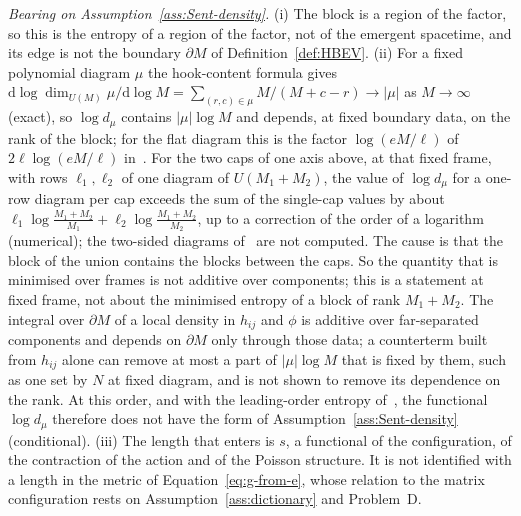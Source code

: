 \emph{Bearing on Assumption~\ref{ass:Sent-density}.} (i) The block is a region of the factor, so this is the entropy of a region of the factor, not of the emergent spacetime, and its edge is not the boundary \(\partial M\) of Definition~\ref{def:HBEV}. (ii) For a fixed polynomial diagram \(\mu\) the hook-content formula gives \(\mathrm d\log\dim_{U(M)}\mu/\mathrm d\log M=\sum_{(r,c)\in\mu}M/(M+c-r)\to|\mu|\) as \(M\to\infty\) (exact), so \(\log d_\mu\) contains \(|\mu|\log M\) and depends, at fixed boundary data, on the rank of the block; for the flat diagram this is the factor \(\log(eM/\ell)\) of \(2\ell\log(eM/\ell)\) in~\cite{FlissFrenkelHartnollSoni2025}. For the two caps of one axis above, at that fixed frame, with rows \(\ell_1,\ell_2\) of one diagram of \(U(M_1+M_2)\), the value of \(\log d_\mu\) for a one-row diagram per cap exceeds the sum of the single-cap values by about \(\ell_1\log\frac{M_1+M_2}{M_1}+\ell_2\log\frac{M_1+M_2}{M_2}\), up to a correction of the order of a logarithm (numerical); the two-sided diagrams of~\cite{FlissFrenkelHartnollSoni2025} are not computed. The cause is that the block of the union contains the blocks between the caps. So the quantity that is minimised over frames is not additive over components; this is a statement at fixed frame, not about the minimised entropy of a block of rank \(M_1+M_2\). The integral over \(\partial M\) of a local density in \(h_{ij}\) and \(\phi\) is additive over far-separated components and depends on \(\partial M\) only through those data; a counterterm built from \(h_{ij}\) alone can remove at most a part of \(|\mu|\log M\) that is fixed by them, such as one set by \(N\) at fixed diagram, and is not shown to remove its dependence on the rank. At this order, and with the leading-order entropy of~\cite{FlissFrenkelHartnollSoni2025}, the functional \(\log d_\mu\) therefore does not have the form of Assumption~\ref{ass:Sent-density} (conditional). (iii) The length that enters is \(s\), a functional of the configuration, of the contraction of the action and of the Poisson structure. It is not identified with a length in the metric of Equation~\eqref{eq:g-from-e}, whose relation to the matrix configuration rests on Assumption~\ref{ass:dictionary} and Problem~D.

